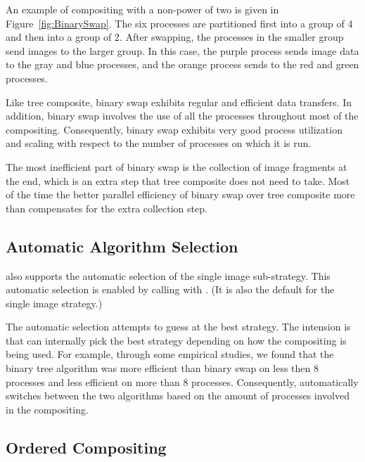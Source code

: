 An example of compositing with a non-power of two is given in
Figure~\ref{fig:BinarySwap}.  The six processes are partitioned first into
a group of 4 and then into a group of 2.  After swapping, the processes in
the smaller group send images to the larger group.  In this case, the purple
process sends image data to the gray and blue processes, and the orange
process sends to the red and green processes.

Like tree composite, binary swap exhibits regular and efficient data
transfers.  In addition, binary swap involves the use of all the processes
throughout most of the compositing.  Consequently, binary swap exhibits
very good process utilization and scaling with respect to the number of
processes on which it is run.

The most inefficient part of binary swap is the collection of image
fragments at the end, which is an extra step that tree composite does not
need to take.  Most of the time the better parallel efficiency of binary
swap over tree composite more than compensates for the extra collection
step.


\subsection{Automatic Algorithm Selection}


\IceT also supports the automatic selection of the single image
sub-strategy.  This automatic selection is enabled by calling
 with
. (It is also the default
for the single image strategy.)

The automatic selection attempts to guess at the best strategy.  The
intension is that \IceT can internally pick the best strategy depending on
how the compositing is being used.  For example, through some empirical
studies, we found that the binary tree algorithm was more efficient than
binary swap on less then 8 processes and less efficient on more than 8
processes.  Consequently, \IceT automatically switches between the two
algorithms based on the amount of processes involved in the compositing.


\subsection{Ordered Compositing}


